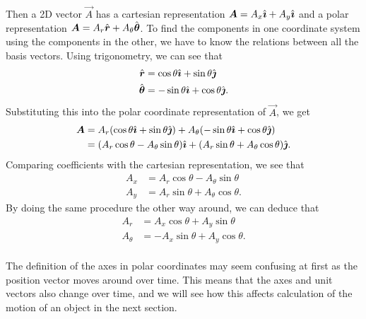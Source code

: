 \documentclass[../classical_mechanics.tex]{subfiles}
\begin{document}
        \paragraph{}
        Then a 2D vector $\vec{A}$ has a cartesian representation $\boldsymbol{A}=A_x\hat{\boldsymbol{\imath}}+A_y\hat{\boldsymbol{\imath}}$ and a polar representation $\boldsymbol{A}=A_r\hat{\boldsymbol{r}}+A_\theta\hat{\boldsymbol{\theta}}$.
        To find the components in one coordinate system using the components in the other, we have to know the relations between all the basis vectors.
        Using trigonometry, we can see that
        \begin{align}
            \hat{\boldsymbol{r}}&=\cos\theta\hat{\boldsymbol{\imath}}+\sin\theta\hat{\boldsymbol{\jmath}}\label{eq:2d-polar-uvec-r}\\
            \hat{\boldsymbol{\theta}}&=-\sin\theta\hat{\boldsymbol{\imath}}+\cos\theta\hat{\boldsymbol{\jmath}}\label{eq:2d-polar-uvec-theta}.
        \end{align}
        Substituting this into the polar coordinate representation of $\vec{A}$, we get
        \begin{align}
            \boldsymbol{A}&=A_r(\cos\theta\hat{\boldsymbol{\imath}}+\sin\theta\hat{\boldsymbol{\jmath}})+A_\theta(-\sin\theta\hat{\boldsymbol{\imath}}+\cos\theta\hat{\boldsymbol{\jmath}})\\
            &=(A_r\cos\theta-A_\theta\sin\theta)\hat{\boldsymbol{\imath}}+(A_r\sin\theta+A_\theta\cos\theta)\hat{\boldsymbol{\jmath}}.
        \end{align}
        Comparing coefficients with the cartesian representation, we see that
        \begin{align}
            A_x&=A_r\cos\theta-A_\theta\sin\theta\\
            A_y&=A_r\sin\theta+A_\theta\cos\theta.
        \end{align}
        By doing the same procedure the other way around, we can deduce that
        \begin{align}
            A_r&=A_x\cos\theta+A_y\sin\theta\\
            A_\theta&=-A_x\sin\theta+A_y\cos\theta.
        \end{align}

        \paragraph{}
        The definition of the axes in polar coordinates may seem confusing at first as the position vector moves around over time.
        This means that the axes and unit vectors also change over time, and we will see how this affects calculation of the motion of an object in the next section.
\end{document}
